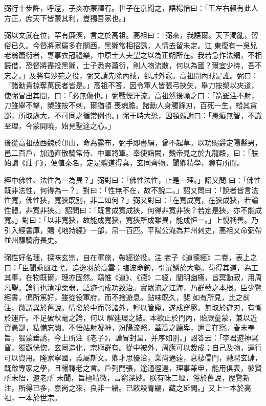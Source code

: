 \begin{pinyinscope}
 弼行十步許，呼還，子炎亦蒙釋宥。世子在京聞之，語楊愔曰：「王左右賴有此人方正，庶天下皆蒙其利，豈獨吾家也。」



 弼以文武在位，罕有廉潔，言之於高祖。高祖曰：「弼來，我語爾。天下濁亂，習俗已久。今督將家屬多在關西，黑獺常相招誘，人情去留未定。江
 東復有一吳兒老翁蕭衍者，專事衣冠禮樂，中原士大夫望之以為正朔所在。我若急作法網，不相饒借，恐督將盡投黑獺，士子悉奔蕭衍，則人物流散，何以為國？爾宜少待，吾不忘之。」及將有沙苑之役，弼又請先除內賊，卻討外寇。高祖問內賊是誰。弼曰：「諸勳貴掠奪萬民者皆是。」高祖不答，因令軍人皆張弓挾矢，舉刀按槊以夾道，使弼冒出其間，曰：「必無傷也。」弼戰慄汗流。高祖然後喻之曰：「箭雖注不射，刀雖舉不擊，槊雖按不刺，爾猶頓
 喪魂膽。諸勳人身觸鋒刃，百死一生，縱其貪鄙，所取處大，不可同之循常例也。」弼于時大恐，因頓顙謝曰：「愚癡無智，不識至理，今蒙開曉，始見聖達之心。」



 後從高祖破西魏於邙山，命為露布，弼手即書絹，曾不起草。以功賜爵定陽縣男，邑二百戶，加通直散騎常侍、中軍將軍。奉使詣闕，魏帝見之於九龍殿，曰：「朕始讀《莊子》，便值秦名，定是體道得真，玄同齊物。聞卿精學，聊有所問。



 經中佛性、法性為一為異？」弼對曰：「佛性法性，止是一理。」詔又問
 曰：「佛性既非法性，何得為一？」對曰：「性無不在，故不說二。」詔又問曰：「說者皆言法性寬，佛性狹，寬狹既別，非二如何？」弼又對曰：「在寬成寬，在狹成狹，若論性體，非寬非狹。」詔問曰：「既言成寬成狹，何得非寬非狹？若定是狹，亦不能成寬。」對曰：「以非寬狹，故能成寬狹，寬狹所成雖異，能成恒一。」上悅稱善。乃引入經書庫，賜《地持經》一部，帛一百匹。平陽公淹為并州刺史，高祖又命弼帶並州驃騎府長史。


弼性好名理，探味玄宗，自在軍旅，帶經從役。注
 老子《道德經》二卷，表上之曰：「臣聞乘風理弋，追逸羽於高雲；臨波命鉤，引沉鱗於大壑。茍得其道，為工其事，在物既爾，理亦固然。竊惟《道》、《德》二經，闡明幽極，旨冥動寂，用周凡聖。論行也清凈柔弱，語迹也成功致治。實眾流之江海，乃群藝之本根。臣少覽經書，偏所篤好，雖從役軍府，而不捨遊息。鉆味既久，斐
 如有所見，比之前注，微謂異於舊說。情發於中而彰諸外，輕以管窺，遂成穿鑿。無取於遊刃，有慚於運斤。不足破秋毫之論，何以
 解連環之結。本欲止於門內，貽厥童蒙，兼以近資愚鄙，私備忘闕。不悟姑射凝神，汾陽流照，蓋高之聽卑，邇言在察。春末奉旨，猥蒙垂誘，今上所注《老子》，謹冒封呈，并序如別。」詔答云：「李君遊神冥窅，獨觀恍惚，玄同造化，宗極群有。從中被外，周應可以裁成；自己及物，運行可以資用。隆家寧國，義屬斯文。卿才思優洽，業尚通遠，息棲儒門，馳騁玄肆，既啟專家之學，且暢釋老之言。戶列門張，途通徑達，理事兼申，能用俱表，彼賢所未悟，遺老所
 未聞，旨極精微，言窮深妙。朕有味二經，倦於舊說，歷覽新注，所得已多，嘉尚之來，良非一緒。已敕殺青編，藏之延閣。」又上一本於高祖，一本於世宗。




\end{pinyinscope}
